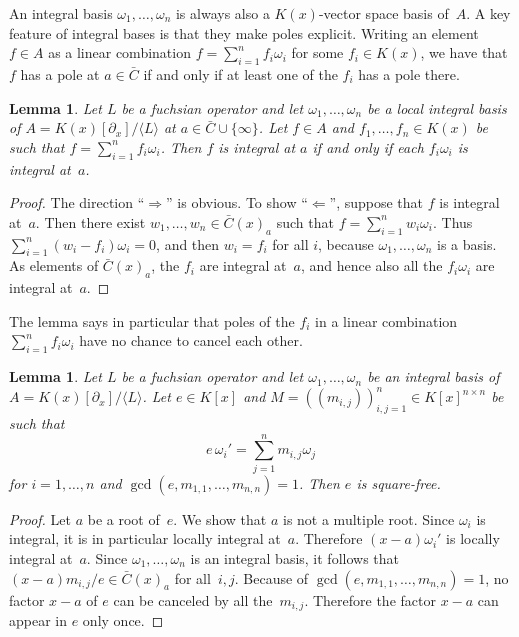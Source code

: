 \documentclass{sig-alternate}
\newtheorem{lemma}[theorem]{Lemma}
\def\<#1>{\langle#1\rangle}
\begin{document}
An integral basis $\omega_1,\dots,\omega_n$ is always also a $K(x)$-vector space
basis of~$A$. A key feature of integral bases is that they make poles explicit. Writing
an element $f\in A$ as a linear combination $f=\sum_{i=1}^n f_i\omega_i$ for some
$f_i\in K(x)$, we have that $f$ has a pole at $a\in\bar C$ if and only if at least one
of the $f_i$ has a pole there.

\begin{lemma}\label{lemma:1}
  Let $L$ be a fuchsian operator and let
  $\omega_1,\dots,\omega_n$ be a local integral basis of $A=K(x)[\partial_x]/\<L>$ at $a\in\bar C\cup\{\infty\}$.
  Let $f\in A$ and $f_1,\dots,f_n\in K(x)$ be such that $f=\sum_{i=1}^nf_i\omega_i$.
  Then $f$ is integral at $a$ if and only if each $f_i\omega_i$ is integral at~$a$.
\end{lemma}
\begin{proof}
  The direction ``$\Rightarrow$'' is obvious. To show ``$\Leftarrow$'', suppose
  that $f$ is integral at~$a$. Then there exist $w_1,\dots,w_n\in\bar C(x)_a$ such that
  $f=\sum_{i=1}^nw_i\omega_i$. Thus $\sum_{i=1}^n(w_i-f_i)\omega_i=0$, and then
  $w_i=f_i$ for all $i$, because $\omega_1,\dots,\omega_n$ is a basis.
  As elements of $\bar C(x)_a$, the $f_i$ are integral at~$a$, and hence also all the $f_i\omega_i$
  are integral at~$a$.
\end{proof}

The lemma says in particular that poles of the $f_i$ in a linear combination
$\sum_{i=1}^n f_i\omega_i$ have no chance to cancel each other.

\begin{lemma}\label{lemma:e}
  Let $L$ be a fuchsian operator and let
  $\omega_1,\dots,\omega_n$ be an integral basis of $A=K(x)[\partial_x]/\<L>$.
  Let $e\in K[x]$ and
  $M=((m_{i,j}))_{i,j=1}^n\in K[x]^{n\times n}$ be such that
  \[
    e\,\omega_i'=\sum_{j=1}^n m_{i,j}\omega_j
  \]
  for $i=1,\dots,n$ and $\gcd(e,m_{1,1},\dots,m_{n,n})=1$.
  Then $e$ is square-free.
\end{lemma}
\begin{proof}
  Let $a$ be a root of~$e$. We show that $a$ is not a multiple root.
  Since $\omega_i$ is integral, it is in particular locally integral at~$a$.
  Therefore $(x-a)\omega_i'$ is locally integral at~$a$.
  Since $\omega_1,\dots,\omega_n$ is an integral basis, it follows that
  $(x-a)m_{i,j}/e\in\bar C(x)_a$ for all~$i,j$.
  Because of $\gcd(e,m_{1,1},\dots,m_{n,n})=1$, no factor $x-a$ of $e$
  can be canceled by all the~$m_{i,j}$.
  Therefore the factor $x-a$ can appear in $e$ only once.
\end{proof}
\end{document}
